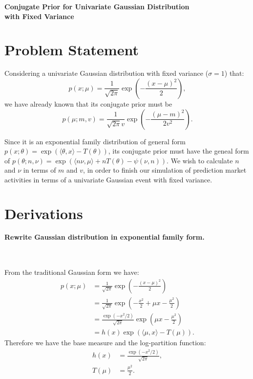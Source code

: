 \documentclass[letterpaper, 12pt]{article}
\begin{document}
\begin{center}
    \textbf{\Large Conjugate Prior for Univariate Gaussian Distribution\\ with Fixed Variance}
\end{center}

\section*{Problem Statement}
Considering a univariate Gaussian distribution with fixed variance ($\sigma=1$) that:
\[ p(x;\mu)=\frac{1}{\sqrt{2\pi}}\exp\left( -\frac{(x-\mu)^2}{2} \right), \]
we have already known that its conjugate prior must be \[p(\mu;m,v)=\frac{1}{\sqrt{2\pi}v}\exp\left( -\frac{(\mu-m)^2}{2v^2} \right).\]

Since it is an exponential family distribution of general form $p(x;\theta)=\exp\left( \langle\theta,x\rangle-T(\theta) \right)$, its conjugate prior must have the geneal form of $p(\theta;n,\nu)=\exp\left( \langle n\nu,\mu\rangle+nT(\theta)-\psi(\nu,n) \right).$ We wish to calculate $n$ and $\nu$ in terms of $m$ and $v$, in order to finish our simulation of prediction market activities in terms of a univariate Gaussian event with fixed variance.

\section*{Derivations}
\paragraph{Rewrite Gaussian distribution in exponential family form.}~

From the traditional Gaussian form we have:
\begin{align*}
    p(x;\mu)&=\frac{1}{\sqrt{2\pi}}\exp\left( -\frac{(x-\mu)^2}{2} \right)\\
    &=\frac{1}{\sqrt{2\pi}}\exp\left( -\frac{x^2}{2}+\mu x-\frac{\mu^2}{2} \right)\\
    &=\frac{\exp\left( -x^2/2 \right)}{\sqrt{2\pi}}\exp\left( \mu x-\frac{\mu^2}{2} \right)\\
    &=h(x)\exp\left( \langle\mu,x\rangle-T(\mu) \right).
\end{align*}
Therefore we have the base measure and the log-partition function:
\begin{align*}
    h(x)&=\frac{\exp(-x^2/2)}{\sqrt{2\pi}},\\
    T(\mu)&=\frac{\mu^2}{2}.
\end{align*}
\newpage
\end{document}

